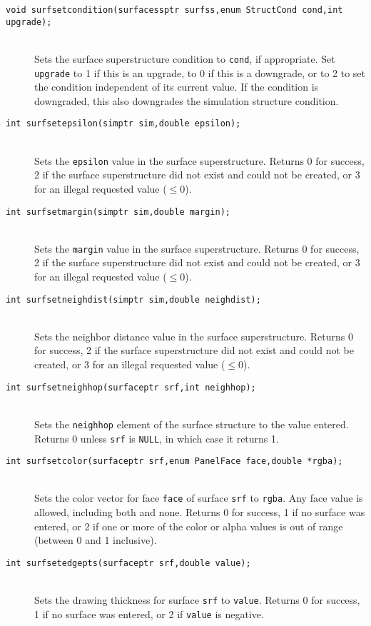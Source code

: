 \documentclass {book}
\newcommand {\ttt} {\texttt}
\begin{document}
\begin{description}
\item[\ttt{void surfsetcondition(surfacessptr surfss,enum StructCond cond,int upgrade);}]
\hfill \\
Sets the surface superstructure condition to \ttt{cond}, if appropriate. Set \ttt{upgrade} to 1 if this is an upgrade, to 0 if this is a downgrade, or to 2 to set the condition independent of its current value. If the condition is downgraded, this also downgrades the simulation structure condition.

\item[\ttt{int surfsetepsilon(simptr sim,double epsilon);}]
\hfill \\
Sets the \ttt{epsilon} value in the surface superstructure. Returns 0 for success, 2 if the surface superstructure did not exist and could not be created, or 3 for an illegal requested value ($\leq 0$).

\item[\ttt{int surfsetmargin(simptr sim,double margin);}]
\hfill \\
Sets the \ttt{margin} value in the surface superstructure. Returns 0 for success, 2 if the surface superstructure did not exist and could not be created, or 3 for an illegal requested value ($\leq 0$).

\item[\ttt{int surfsetneighdist(simptr sim,double neighdist);}]
\hfill \\
Sets the neighbor distance value in the surface superstructure. Returns 0 for success, 2 if the surface superstructure did not exist and could not be created, or 3 for an illegal requested value ($\leq 0$).

\item[\ttt{int surfsetneighhop(surfaceptr srf,int neighhop);}]
\hfill \\
Sets the \ttt{neighhop} element of the surface structure to the value entered. Returns 0 unless \ttt{srf} is \ttt{NULL}, in which case it returns 1.

\item[\ttt{int surfsetcolor(surfaceptr srf,enum PanelFace face,double *rgba);}]
\hfill \\
Sets the color vector for face \ttt{face} of surface \ttt{srf} to \ttt{rgba}. Any face value is allowed, including both and none. Returns 0 for success, 1 if no surface was entered, or 2 if one or more of the color or alpha values is out of range (between 0 and 1 inclusive).

\item[\ttt{int surfsetedgepts(surfaceptr srf,double value);}]
\hfill \\
Sets the drawing thickness for surface \ttt{srf} to \ttt{value}. Returns 0 for success, 1 if no surface was entered, or 2 if \ttt{value} is negative.


\end{description}
\end{document}
